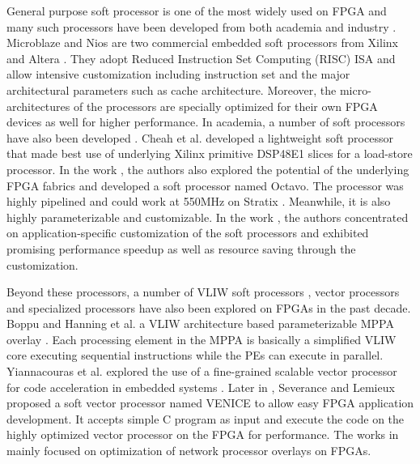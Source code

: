 General purpose soft processor is one of the most widely used on FPGA and many such processors have been developed from both academia and industry \cite{microblaze, nios, cheah2012iDEA, laforest2012OCTAVO, yiannacouras2007exploration}. Microblaze and Nios \uppercase\expandafter{} are two commercial embedded soft processors from Xilinx and Altera \cite{microblaze, nios}. They adopt Reduced Instruction Set Computing (RISC) ISA and allow intensive customization including instruction set and the major architectural parameters such as cache architecture. Moreover, the micro-architectures of the processors are specially optimized for their own FPGA devices as well for higher performance. In academia, a number of soft processors have also been developed \cite{cheah2012iDEA, laforest2012OCTAVO}. Cheah et al. developed a lightweight soft processor that made best use of underlying Xilinx primitive DSP48E1 slices for a load-store processor. In the work \cite{laforest2012OCTAVO}, the authors also explored the potential of the underlying FPGA fabrics and developed a soft processor named Octavo. The processor was highly pipelined and could work at 550MHz on Stratix \uppercase\expandafter{}. Meanwhile, it is also highly parameterizable and customizable. In the work \cite{yiannacouras2007exploration}, the authors concentrated on application-specific customization of the soft processors and exhibited promising performance speedup as well as resource saving through the customization.

Beyond these processors, a number of VLIW soft processors \cite{anjam2010vliw,hannig2014invasive, boppu2014compact}, vector processors \cite{yiannacouras2009fine, guy2012VENICE} and specialized processors \cite{buciak2007lightweight, liu2004fpga} have also been explored on FPGAs in the past decade. Boppu and Hanning et al. a VLIW architecture based parameterizable MPPA overlay \cite{hannig2014invasive, boppu2014compact}. Each processing element in the MPPA is basically a simplified VLIW core executing sequential instructions while the PEs can execute in parallel. Yiannacouras et al. explored the use of a fine-grained scalable vector processor for code acceleration in embedded systems \cite{yiannacouras2009fine}. Later in \cite{guy2012VENICE}, Severance and Lemieux proposed a soft vector processor named VENICE to allow easy FPGA application development. It accepts simple C program as input and execute the code on the highly optimized vector processor on the FPGA for performance. The works in \cite{buciak2007lightweight, liu2004fpga} mainly focused on optimization of network processor overlays on FPGAs.  


